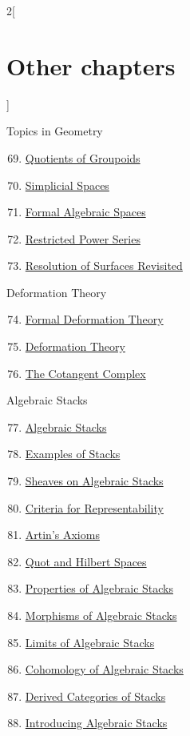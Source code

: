 \begin{multicols}{2}[\section{Other chapters}]
\begin{enumerate}
\end{enumerate}
Topics in Geometry
\begin{enumerate}
\setcounter{enumi}{68}
\item \hyperref[groupoids-quotients-section-phantom]{Quotients of Groupoids}
\item \hyperref[spaces-simplicial-section-phantom]{Simplicial Spaces}
\item \hyperref[formal-spaces-section-phantom]{Formal Algebraic Spaces}
\item \hyperref[restricted-section-phantom]{Restricted Power Series}
\item \hyperref[spaces-resolve-section-phantom]{Resolution of Surfaces Revisited}
\end{enumerate}
Deformation Theory
\begin{enumerate}
\setcounter{enumi}{73}
\item \hyperref[formal-defos-section-phantom]{Formal Deformation Theory}
\item \hyperref[defos-section-phantom]{Deformation Theory}
\item \hyperref[cotangent-section-phantom]{The Cotangent Complex}
\end{enumerate}
Algebraic Stacks
\begin{enumerate}
\setcounter{enumi}{76}
\item \hyperref[algebraic-section-phantom]{Algebraic Stacks}
\item \hyperref[examples-stacks-section-phantom]{Examples of Stacks}
\item \hyperref[stacks-sheaves-section-phantom]{Sheaves on Algebraic Stacks}
\item \hyperref[criteria-section-phantom]{Criteria for Representability}
\item \hyperref[artin-section-phantom]{Artin's Axioms}
\item \hyperref[quot-section-phantom]{Quot and Hilbert Spaces}
\item \hyperref[stacks-properties-section-phantom]{Properties of Algebraic Stacks}
\item \hyperref[stacks-morphisms-section-phantom]{Morphisms of Algebraic Stacks}
\item \hyperref[stacks-limits-section-phantom]{Limits of Algebraic Stacks}
\item \hyperref[stacks-cohomology-section-phantom]{Cohomology of Algebraic Stacks}
\item \hyperref[stacks-perfect-section-phantom]{Derived Categories of Stacks}
\item \hyperref[stacks-introduction-section-phantom]{Introducing Algebraic Stacks}

\end{enumerate}
\end{multicols}
